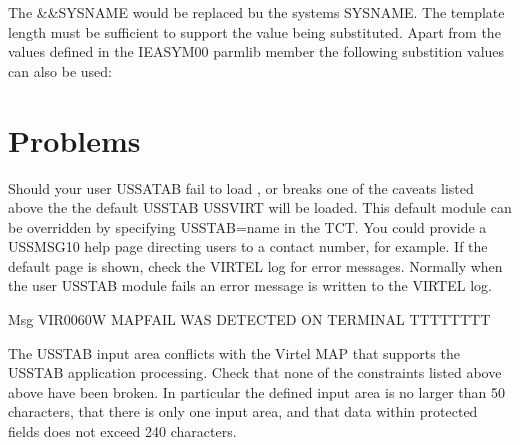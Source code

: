 \documentclass[letterpaper,10pt,english]{sphinxmanual}
\begin{document}
\sphinxAtStartPar
The \&\&SYSNAME would be replaced bu the systems SYSNAME. The template length must be sufficient to support the value being substituted. Apart from the values defined in the IEASYM00 parmlib member the following substition values can also be used:\sphinxhyphen{}

\begin{sphinxVerbatim}[commandchars=\\\{\}]
     
                           
                                  
                                  
                                
                                
\end{sphinxVerbatim}


\section{Problems}
\label{\detokenize{Customization:problems}}
\sphinxAtStartPar
Should your user USSATAB fail to load , or breaks one of the caveats listed above the the default USSTAB USSVIRT will be loaded. This default module can be overridden by specifying USSTAB=name in the TCT. You could provide a USSMSG10 help page directing users to a contact number, for example. If the default page is shown, check the VIRTEL log for error messages. Normally when the user USSTAB module fails an error message is written to the VIRTEL log.

\sphinxAtStartPar
Msg VIR0060W MAPFAIL WAS DETECTED ON TERMINAL TTTTTTTT

\sphinxAtStartPar
The USSTAB input area conflicts with the Virtel MAP that supports the USSTAB application processing. Check that none of the constraints listed above above have been broken. In particular the defined input area is no larger than 50 characters, that there is only one input area, and that data within protected fields does not exceed 240 characters.
\end{document}
